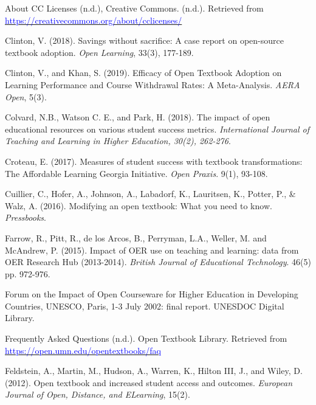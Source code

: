\documentclass[11pt]{article}
\newcommand{\alink}[2]{\href{#1}{\textcolor{blue}{#2}}}
\begin{document}
\begin{thebibliography}{99}
   About CC Licenses (n.d.), Creative Commons. (n.d.). Retrieved from \alink{https://creativecommons.org/about/cclicenses/}{https://creativecommons.org/about/cclicenses/}

   Clinton, V. (2018). Savings without sacrifice: A case report on open-source textbook adoption. {\em Open Learning}, 33(3), 177-189.

   Clinton, V., and Khan, S. (2019). Efficacy of Open Textbook Adoption on Learning Performance and Course Withdrawal Rates: A Meta-Analysis. {\em AERA Open}, 5(3).%

 Colvard, N.\/B., Watson C.\/ E., and Park, H. (2018). The impact of open educational resources on various student success metrics. {\em International Journal of Teaching and Learning in Higher Education, 30(2), 262-276}.

 Croteau, E. (2017). Measures of student success with textbook transformations: The Affordable Learning Georgia Initiative. {\em Open Praxis}. 9(1), 93-108.

   Cuillier, C., Hofer, A., Johnson, A., Labadorf, K., Lauritsen, K., Potter, P., \& Walz, A. (2016). Modifying an open textbook: What you need to know.  {\em Pressbooks}.%

   Farrow, R., Pitt, R., de los Arcos, B., Perryman, L.A., Weller, M. and McAndrew, P. (2015). Impact of OER use on teaching and learning: data from OER Research Hub (2013-2014). {\em British Journal of Educational Technology}. 46(5) pp. 972-976.

   Forum on the Impact of Open Courseware for Higher Education in Developing Countries, UNESCO, Paris, 1-3 July 2002: final report.  UNESDOC Digital Library.%

   Frequently Asked Questions (n.d.). Open Textbook Library. Retrieved from \alink{https://open.umn.edu/opentextbooks/faq}{https://open.umn.edu/opentextbooks/faq}

   Feldstein, A., Martin, M., Hudson, A., Warren, K., Hilton III, J., and Wiley, D. (2012). Open textbook and increased student access and outcomes. {\em European Journal of Open, Distance, and ELearning}, 15(2).


\end{thebibliography}
\end{document}
